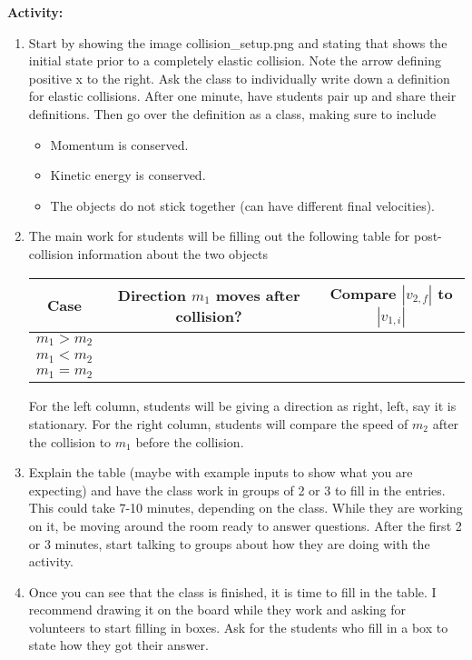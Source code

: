 \documentclass{article}
\begin{document}
\textbf{Activity:}
\begin{enumerate}
\item Start by showing the image collision\_setup.png and stating that shows the initial state prior to a completely elastic collision. Note the arrow defining positive x to the right. Ask the class to individually write down a definition for elastic collisions. After one minute, have students pair up and share their definitions. Then go over the definition as a class, making sure to include
\begin{itemize}
	\item Momentum is conserved.
	\item Kinetic energy is conserved.
	\item The objects do not stick together (can have different final velocities).
\end{itemize}

\item The main work for students will be filling out the following table for post-collision information about the two objects

\hspace{12pt}

\begin{tabular}{| c | c | c |}
	\hline
	Case & Direction $m_1$ moves after collision? & Compare $|v_{2,f}|$ to $|v_{1,i}|$ \\ \hline
	$m_1 > m_2$ & & \\ \hline
	$m_1 < m_2$ & & \\ \hline 
	$m_1 = m_2$ & & \\ \hline
\end{tabular}

\hspace{12pt}

For the left column, students will be giving a direction as right, left, say it is stationary. For the right column, students will compare the speed of $m_2$ after the collision to $m_1$ before the collision.

\item Explain the table (maybe with example inputs to show what you are expecting) and have the class work in groups of 2 or 3 to fill in the entries. This could take 7-10 minutes, depending on the class. While they are working on it, be moving around the room ready to answer questions. After the first 2 or 3 minutes, start talking to groups about how they are doing with the activity.

\item Once you can see that the class is finished, it is time to fill in the table. I recommend drawing it on the board while they work and asking for volunteers to start filling in boxes. Ask for the students who fill in a box to state how they got their answer.


\end{enumerate}
\end{document}
